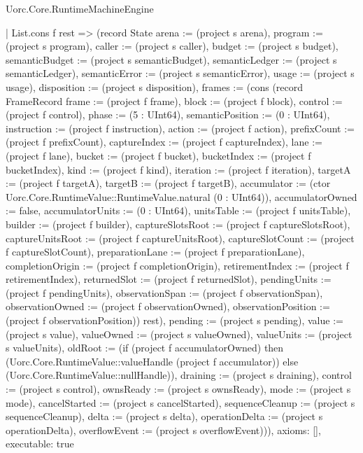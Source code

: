 \begin{lexlean}{Uorc.Core.RuntimeMachineEngine}
\begin{semanticmodule}
{    | List.cons f rest => (record State {arena := (project s arena), program := (project s program), caller := (project s caller), budget := (project s budget), semanticBudget := (project s semanticBudget), semanticLedger := (project s semanticLedger), semanticError := (project s semanticError), usage := (project s usage), disposition := (project s disposition), frames := (cons (record FrameRecord {frame := (project f frame), block := (project f block), control := (project f control), phase := (5 : UInt64), semanticPosition := (0 : UInt64), instruction := (project f instruction), action := (project f action), prefixCount := (project f prefixCount), captureIndex := (project f captureIndex), lane := (project f lane), bucket := (project f bucket), bucketIndex := (project f bucketIndex), kind := (project f kind), iteration := (project f iteration), targetA := (project f targetA), targetB := (project f targetB), accumulator := (ctor Uorc.Core.RuntimeValue::RuntimeValue.natural (0 : UInt64)), accumulatorOwned := false, accumulatorUnits := (0 : UInt64), unitsTable := (project f unitsTable), builder := (project f builder), captureSlotsRoot := (project f captureSlotsRoot), captureUnitsRoot := (project f captureUnitsRoot), captureSlotCount := (project f captureSlotCount), preparationLane := (project f preparationLane), completionOrigin := (project f completionOrigin), retirementIndex := (project f retirementIndex), returnedSlot := (project f returnedSlot), pendingUnits := (project f pendingUnits), observationSpan := (project f observationSpan), observationOwned := (project f observationOwned), observationPosition := (project f observationPosition)}) rest), pending := (project s pending), value := (project s value), valueOwned := (project s valueOwned), valueUnits := (project s valueUnits), oldRoot := (if (project f accumulatorOwned) then (Uorc.Core.RuntimeValue::valueHandle (project f accumulator)) else (Uorc.Core.RuntimeValue::nullHandle)), draining := (project s draining), control := (project s control), ownsReady := (project s ownsReady), mode := (project s mode), cancelStarted := (project s cancelStarted), sequenceCleanup := (project s sequenceCleanup), delta := (project s delta), operationDelta := (project s operationDelta), overflowEvent := (project s overflowEvent)})),
  axioms: [],
  executable: true
}


\end{semanticmodule}
\end{lexlean}
